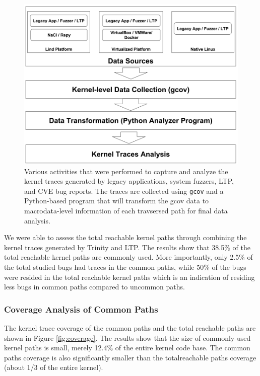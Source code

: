 \begin{figure}%
\centering
\includegraphics[width=1.0\columnwidth]{diagram/data_collection.png}
\caption{Various activities that were performed to capture and analyze the kernel
 traces generated by legacy applications, system fuzzers, LTP, and CVE bug
 reports. The traces are collected using \texttt{gcov} and a Python-based program that will transform the gcov data to macrodata-level information of each travsersed path for final data analysis.}
 

\label{fig:datacollection}
\end{figure}

We were able to assess the total reachable kernel paths through combining the kernel traces generated by Trinity and LTP. The results show that 38.5\% of the total reachable
kernel paths are commonly used. More importantly, only 2.5\% of the total studied bugs had traces in the common paths, while 50\% of the bugs were resided in the total reachable kernel paths which is an indication of residing less bugs in common paths compared to uncommon paths.
 

\subsubsection{Coverage Analysis of Common Paths}

The kernel trace coverage of the common paths and the total reachable paths
are shown in Figure \ref{fig:coverage}. %
The results show that the size of commonly-used kernel paths is small,
merely 12.4\% of the entire kernel code base. The common paths coverage is also significantly smaller than the totalreachable paths coverage
(about 1/3 of the entire kernel).

